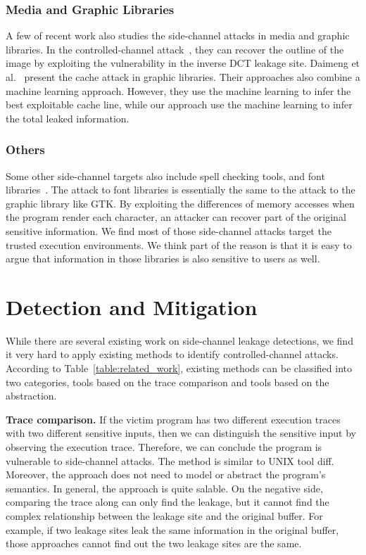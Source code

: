 \subsubsection{Media and Graphic Libraries}
A few of recent work also studies the side-channel attacks in media and graphic libraries. In the controlled-channel attack~\cite{xu2015controlled}, they can recover the outline of the image by exploiting the vulnerability in the inverse DCT leakage site. Daimeng et al.~\cite{wang2019unveiling} present the cache attack in graphic libraries. Their approaches also combine a machine learning approach. However, they use the machine learning to infer the best exploitable cache line, while our approach use the machine learning to infer the total leaked information.
\subsubsection{Others}
Some other side-channel targets also include spell checking tools, and font libraries~\cite{xu2015controlled}. The attack to font libraries is essentially the same to the attack to the graphic library like GTK. By exploiting the differences of memory accesses when the program render each character, an attacker can recover part of the original sensitive information. We find most of those side-channel attacks target the trusted execution environments. We think part of the reason is that it is easy to argue that information in those libraries is also sensitive to users as well.

\section{Detection and Mitigation}
While there are several existing work on side-channel leakage detections, we find it very hard to apply existing methods to identify controlled-channel attacks. According to Table~\ref{table:related_work}, existing methods can be classified into two categories, tools based on the trace comparison and tools based on the abstraction. 

\textbf{Trace comparison.} If the victim program has two different execution traces with two different sensitive inputs, then we can distinguish the sensitive input by observing the execution trace. Therefore, we can conclude the program is vulnerable to side-channel attacks. The method is similar to UNIX tool \textsf{diff}. Moreover, the approach does not need to model or abstract the program's semantics. In general, the approach is quite salable. On the negative side, comparing the trace along can only find the leakage, but it cannot find the complex relationship between the leakage site and the original buffer. For example, if two leakage sites leak the same information in the original buffer, those approaches cannot find out the two leakage sites are the same. 

